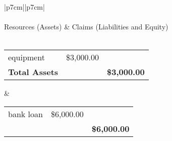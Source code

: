 

\begin{center}
\begin{tabular}{ |p{7cm}||p{7cm}|  }
    \hline
     \\
    \hline
    \\
    Resources (Assets) & Claims (Liabilities and Equity) \\ \\ 
    \begin{tabular}{p{3cm} r r}
        equipment & \$3,000.00  \\

        \textbf{Total Assets} & & \textbf{\$3,000.00}
    \end{tabular}
    &
    \begin{tabular}{p{3cm} r r}
        bank loan & \$6,000.00 \\

     & & \textbf{\$6,000.00}
    \end{tabular} \\
    \hline
\end{tabular}
\end{center}

